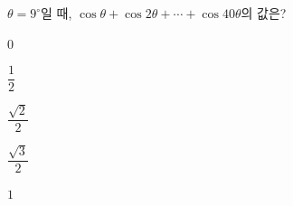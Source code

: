 $\theta=9^\circ$일 때, $\cos\theta+\cos 2\theta+\cdots+\cos 40\theta$의 값은?
\begin{choices32}{\rule[-3ex]{0pt}{8ex}$0$}{\rule[-3ex]{0pt}{8ex}$\dfrac{1}{2}$}{\rule[-3ex]{0pt}{8ex}$\dfrac{\sqrt{2}}{2}$}{\rule[-3ex]{0pt}{8ex}$\dfrac{\sqrt{3}}{2}$}{\rule[-3ex]{0pt}{8ex}$1$}\end{choices32}
